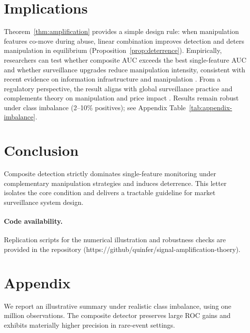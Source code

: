 \documentclass[preprint,12pt,authoryear]{elsarticle}
\begin{document}
\section{Implications}
Theorem~\ref{thm:amplification} provides a simple design rule: when manipulation features co-move during abuse, linear combination improves detection and deters manipulation in equilibrium (Proposition~\ref{prop:deterrence}). Empirically, researchers can test whether composite AUC exceeds the best single-feature AUC and whether surveillance upgrades reduce manipulation intensity, consistent with recent evidence on information infrastructure and manipulation \citep{liu2024asset,xiong2024information,wang2024information}. From a regulatory perspective, the result aligns with global surveillance practice \citep{cumming2008global} and complements theory on manipulation and price impact \citep{huberman2004price}. Results remain robust under class imbalance (2--10\% positives); see Appendix Table~\ref{tab:appendix-imbalance}.

\section{Conclusion}
Composite detection strictly dominates single-feature monitoring under complementary manipulation strategies and induces deterrence. This letter isolates the core condition and delivers a tractable guideline for market surveillance system design.

\bigskip
\bigskip
\bigskip
\paragraph{Code availability.} Replication scripts for the numerical illustration and robustness checks are provided in the repository (https://github/quinfer/signal-amplification-thoery).

\section*{Appendix}
We report an illustrative summary under realistic class imbalance, using one million observations. The composite detector preserves large ROC gains and exhibits materially higher precision in rare-event settings.
\end{document}
